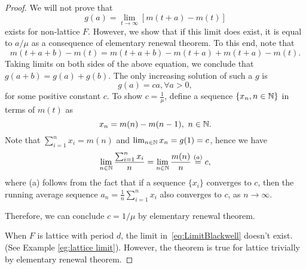 \documentclass[a4paper,10pt,english]{article}
\begin{document}
\begin{proof} 
We will not prove that 
\begin{equation}
\label{eq:LimitBlackwell}
g(a) = \lim_{t \to \infty} [m(t+a) - m(t)]
\end{equation}exists for non-lattice $F$. However, we show that if this limit does exist, it is equal to $a/\mu$ as a consequence of elementary renewal theorem. To this end, note that
\begin{equation*}
m(t+a+b) - m(t) = m(t+a+b) - m(t+a) + m(t+a) - m(t).
\end{equation*}
Taking limits on both sides of the above equation, we conclude that $g(a+b) = g(a) +  g(b)$. The only increasing solution of such a $g$ is
\begin{equation*}
g(a) = ca, \forall a > 0,
\end{equation*}
for some positive constant $c$. To show $c = \frac{1}{\mu}$, define a sequence $\{x_n, n \in \mathbb{N}\}$ in terms of $m(t)$ as 
\begin{equation*}
x_n = m(n) - m(n-1),~n \in \mathbb{N}.
\end{equation*}
Note that $\sum_{i=1}^nx_i = m(n)$ and $\lim_{n \in \mathbb{N}}x_n = g(1) = c$, hence we have
\begin{equation*}
\lim_{n \in \mathbb{N}}\frac{\sum_{i=1}^nx_i}{n} = \lim_{n \in \mathbb{N}}\frac{m(n)}{n} \stackrel{(a)}{=} c,
\end{equation*}
where (a) follows from the fact that if a sequence $\{x_i\}$ converges to $c$, then the running average sequence $a_n = \frac{1}{n}\sum_{i=1}^n x_i$ also converges to $c$, as $n \to \infty.$

Therefore, we can conclude $c = 1/\mu$ by elementary renewal theorem.

When $F$ is lattice with period $d$, the limit in~\eqref{eq:LimitBlackwell} doesn't exist. (See Example \ref{eg:lattice limit}). However, the theorem is true for lattice trivially by elementary renewal theorem.
\end{proof}
\end{document}
